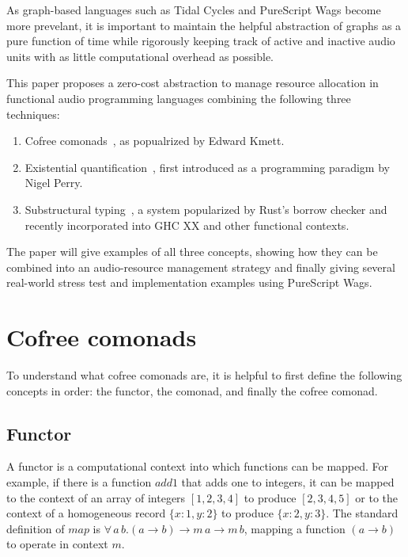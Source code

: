 \documentclass{article}
\begin{document}
As graph-based languages such as Tidal Cycles and PureScript Wags become more prevelant, it is important to maintain the helpful abstraction of graphs as a pure function of time while rigorously keeping track of active and inactive audio units with as little computational overhead as possible.

This paper proposes a zero-cost abstraction to manage resource allocation in functional audio programming languages combining the following three techniques:

\begin{enumerate}
  \item Cofree comonads~\cite{kmettfree, freeman2017declarative}, as popualrized by Edward Kmett.
  \item Existential quantification~\cite{perry1991implementation, laufer1994polymorphic}, first introduced as a programming paradigm by Nigel Perry.
  \item Substructural typing~\cite{walker2005substructural, borrowchecker}, a system popularized by Rust's borrow checker and recently incorporated into GHC XX and other functional contexts.
\end{enumerate}

The paper will give examples of all three concepts, showing how they can be combined into an audio-resource management strategy and finally giving several real-world stress test and implementation examples using PureScript Wags.

\section{Cofree comonads}
\label{sec:cofree_comonads}

To understand what cofree comonads are, it is helpful to first define the following concepts in order: the functor, the comonad, and finally the cofree comonad.

\subsection{Functor}

A functor is a computational context into which functions can be mapped. For example, if there is a function $add1$ that adds one to integers, it can be mapped to the context of an array of integers $[1,2,3,4]$ to produce $[2,3,4,5]$ or to the context of a homogeneous record $\{x:1,y:2\}$ to produce $\{x:2,y:3\}$. The standard definition of $map$ is
$\forall\,a\, b. (a \rightarrow b) \rightarrow m\,a \rightarrow m\,b$, mapping a function $(a \rightarrow b)$ to operate in context $m$.
\end{document}
